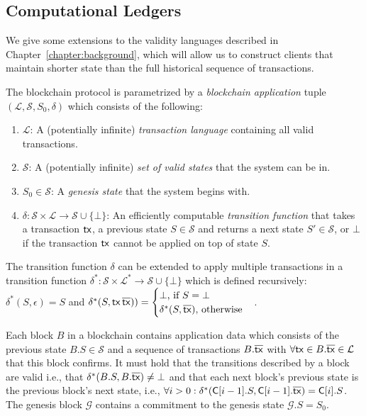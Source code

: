 \subsection{Computational Ledgers}


We give some extensions to the validity languages described in
Chapter~\ref{chapter:background}, which will allow us to construct clients that
maintain shorter state than the full historical sequence of transactions.

The blockchain protocol is parametrized by a \emph{blockchain application}
tuple $(\mathcal{L}, \mathcal{S}, S_0, \delta)$ which consists of the following:


\begin{enumerate}
  \item $\mathcal{L}$: A (potentially infinite) \emph{transaction language} containing all valid
  transactions.
  \item $\mathcal{S}$: A (potentially infinite) \emph{set of valid states} that the system can be in.
  \item $S_0 \in \mathcal{S}$: A \emph{genesis state} that the system begins
  with.
  \item $\delta: \mathcal{S} \times \mathcal{L} \longrightarrow \mathcal{S} \cup \{\bot\}$:
  An efficiently computable \emph{transition function} that takes a transaction
  $\mathsf{tx}$, a previous state $S \in \mathcal{S}$ and returns a next state
  $S' \in \mathcal{S}$, or $\bot$ if the transaction $\mathsf{tx}$ cannot be applied on
  top of state $S$.
\end{enumerate}

The transition function $\delta$ can be extended to apply multiple transactions
in a transition function
$\delta^*: \mathcal{S} \times \mathcal{L}^* \longrightarrow \mathcal{S} \cup \{\bot\}$
which is defined recursively: $\delta^*(S, \epsilon) = S$ and
$\delta^*(S, \mathsf{tx}\,\overline{\mathsf{tx}})) = \begin{cases}
  \bot\text{, if } S = \bot\\
  \delta^*(S, \overline{\mathsf{tx}})\text{, otherwise}\end{cases}$.

Each block $B$ in a blockchain contains application data which consists of the
previous state $B.S \in \mathcal{S}$ and a sequence of transactions
$B.\overline{\mathsf{tx}}$ with $\forall \mathsf{tx} \in B.\overline{\mathsf{tx}} \in \mathcal{L}$ that this
block confirms. It must hold that the transitions described by a block are
valid i.e., that $\delta^*(B.S, B.\overline{\mathsf{tx}}) \neq \bot$ and that each next
block's previous state is the previous block's next state, i.e.,
$\forall i > 0: \delta^*(\mathsf{C}[i - 1].S, \mathsf{C}[i - 1].\overline{\mathsf{tx}}) = \mathsf{C}[i].S$.
The genesis block $\mathcal{G}$ contains a commitment
to the genesis state $\mathcal{G}.S = S_0$.

